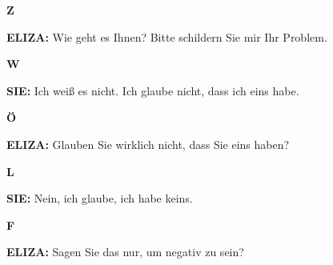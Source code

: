 \documentclass{article}
\begin{document}
\begin{minipage}[t]{0.13\textwidth}
  \centering
  {\bfseries\fontsize{14.4}{14.4}\selectfont\textcolor{pastelorange}{Z}}
\end{minipage}%
\begin{minipage}[t]{0.81\textwidth}
  \textbf{ELIZA:} Wie geht es Ihnen? Bitte schildern Sie mir Ihr Problem.
\end{minipage}

\vspace{0.5cm}

\begin{minipage}[t]{0.13\textwidth}
  \centering
  {\bfseries\fontsize{14.4}{14.4}\selectfont\textcolor{pastelorange}{W}}
\end{minipage}%
\begin{minipage}[t]{0.81\textwidth}
  \textbf{SIE:} Ich weiß es nicht. Ich glaube nicht, dass ich eins habe.
\end{minipage}

\vspace{0.5cm}

\begin{minipage}[t]{0.13\textwidth}
  \centering
  {\bfseries\fontsize{14.4}{14.4}\selectfont\textcolor{pastelorange}{Ö}}
\end{minipage}%
\begin{minipage}[t]{0.81\textwidth}
  \textbf{ELIZA:} Glauben Sie wirklich nicht, dass Sie eins haben?
\end{minipage}

\vspace{0.5cm}

\begin{minipage}[t]{0.13\textwidth}
  \centering
  {\bfseries\fontsize{14.4}{14.4}\selectfont\textcolor{pastelorange}{L}}
\end{minipage}%
\begin{minipage}[t]{0.81\textwidth}
  \textbf{SIE:} Nein, ich glaube, ich habe keins.
\end{minipage}

\vspace{0.5cm}

\begin{minipage}[t]{0.13\textwidth}
  \centering
  {\bfseries\fontsize{14.4}{14.4}\selectfont\textcolor{pastelorange}{F}}
\end{minipage}%
\begin{minipage}[t]{0.81\textwidth}
  \textbf{ELIZA:} Sagen Sie das nur, um negativ zu sein?
\end{minipage}
\end{document}

